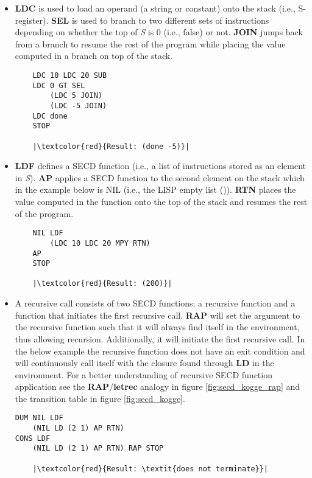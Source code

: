 \documentclass[a4paper,12pt,twoside,openright]{report}
\theoremstyle{definition}
\newcommand{\ts}{\textquotesingle}
\begin{document}
\begin{itemize}
    \item \textbf{LDC} is used to load an operand (a string or constant) onto the stack (i.e., S-register). \textbf{SEL} is used to branch to two different sets of instructions depending on whether the top of \textit{S} is 0 (i.e., false) or not. \textbf{JOIN} jumps back from a branch to resume the rest of the program while placing the value computed in a branch on top of the stack.
\begin{verbatim}
    LDC 10 LDC 20 SUB
    LDC 0 GT SEL
        (LDC 5 JOIN)
        (LDC -5 JOIN)
    LDC done
    STOP
    
    |\textcolor{red}{Result: (done -5)}|
\end{verbatim}
    \item \textbf{LDF} defines a SECD function (i.e., a list of instructions stored as an element in \textit{S}). \textbf{AP} applies a SECD function to the second element on the stack which in the example below is NIL (i.e., the LISP empty list {\ts}()). \textbf{RTN} places the value computed in the function onto the top of the stack and resumes the rest of the program.
\begin{verbatim}
    NIL LDF
        (LDC 10 LDC 20 MPY RTN)
    AP
    STOP

    |\textcolor{red}{Result: (200)}|
\end{verbatim}

    \item A recursive call consists of two SECD functions: a recursive function and a function that initiates the first recursive call. \textbf{RAP} will set the argument to the recursive function such that it will always find itself in the environment, thus allowing recursion. Additionally, it will initiate the first recursive call. In the below example the recursive function does not have an exit condition and will continuously call itself with the closure found through \textbf{LD} in the environment. For a better understanding of recursive SECD function application see the \textbf{RAP}/\textbf{letrec} analogy in figure \ref{fig:secd_kogge_rap} and the transition table in figure \ref{fig:secd_kogge}.
\begin{verbatim}
DUM NIL LDF
    (NIL LD (2 1) AP RTN)
CONS LDF
    (NIL LD (2 1) AP RTN) RAP STOP

    |\textcolor{red}{Result: \textit{does not terminate}}|
\end{verbatim}
\end{itemize}
\end{document}

